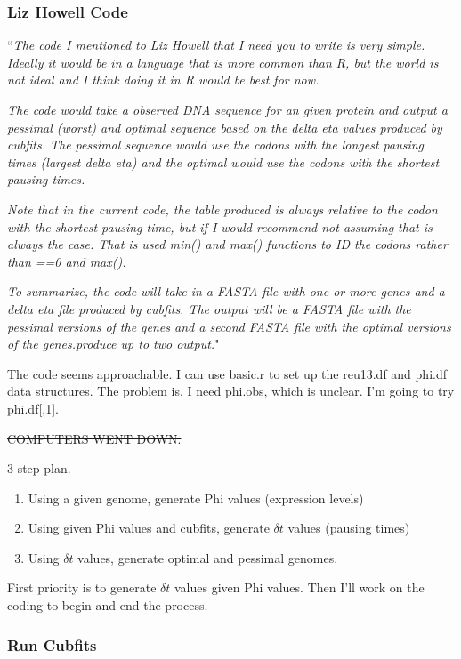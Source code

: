 \documentclass[11pt]{article} %
\begin{document}
\subsubsection{Liz Howell Code}
``\textit{The code I mentioned to Liz Howell that I need you to write is very simple. Ideally it would be in a language that is more common than R, but the world is not ideal and I think doing it in R would be best for now.}

\textit{The code would take a observed DNA sequence for an given protein and output a pessimal (worst) and optimal sequence based on the delta eta values produced by cubfits.  The pessimal sequence would use the codons with the longest pausing times (largest delta eta) and the optimal would use the codons with the shortest pausing times.}

\textit{Note that in the current code, the table produced is always relative to the codon with the shortest pausing time, but if I would recommend not assuming that is always the case.  That is used min() and max() functions to ID the codons rather than ==0 and max().}

\textit{To summarize, the code will take in a FASTA file with one or more genes and a delta eta file produced by cubfits.  The output will be a FASTA file with the pessimal versions of the genes and a second FASTA file with the optimal versions of the genes.produce up to two output.}"


The code seems approachable. I can use basic.r to set up the reu13.df and phi.df data structures. The problem is, I need phi.obs, which is unclear. I'm going to try phi.df[,1].

\sout{COMPUTERS WENT DOWN.}

3 step plan.

\begin{enumerate}
\item Using a given genome, generate Phi values (expression levels)
\item Using given Phi values and cubfits, generate $\delta t$ values (pausing times)
\item Using $\delta t$ values, generate optimal and pessimal genomes.
\end{enumerate}

First priority is to generate $\delta t$ values given Phi values. Then I'll work on the coding to begin and end the process.

\subsubsection{Run Cubfits}
\end{document}
